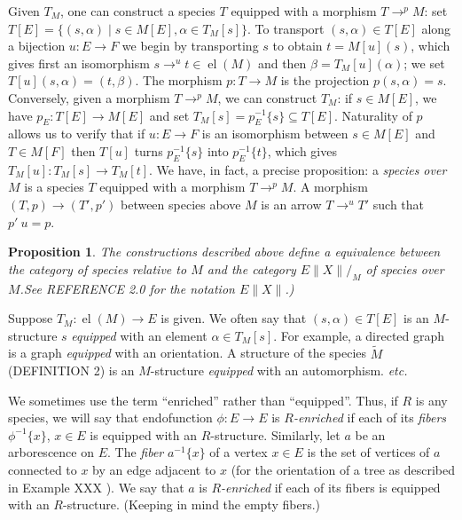 \documentclass{article}
\newtheorem{prop}[thm]{Proposition}
\theoremstyle{definition}
\theoremstyle{remark}
\DeclareMathOperator{\el}{el}
\newcommand{\term}[1]{\emph{#1}}
\begin{document}
Given $T_M$, one can construct a species $T$
equipped with a morphism $T \to^p M$: set $T [E] = \{(s, \alpha) \mid
s \in M [E], \alpha \in T_M[s]\}$. To transport $(s, \alpha) \in T[E]$
along a bijection $u : E \to F$ we begin by transporting $s$ to obtain
$t = M [u] (s)$, which gives first an isomorphism $s \to^u t \in
\el(M)$ and then $\beta = T_M [u] (\alpha)$; we set $T [u] (s, \alpha)
= (t, \beta)$. The morphism $p : T \to M$ is the projection $p (s,
\alpha) = s$. Conversely, given a morphism $T \to^p M$, we can
construct $T_M$: if $s \in M [E]$, we have $p_E: T [E] \to M [E]$ and
set $T_M [s] = p_E^{-1}\{s\} \subseteq T [E]$. Naturality of $p$
allows us to verify that if $u : E \to F$ is an isomorphism between $s
\in M [E]$ and $T \in M [F]$ then $T [u]$ turns $p_E^{-1} \{s\}$ into
$p_E^{-1} \{t\}$, which gives $T_M [u] : T_M [s] \to T_M [t]$. We
have, in fact, a precise proposition: a \term{species over $M$} is a
species $T$ equipped with a morphism $T \to^p M$. A morphism $(T, p)
\to (T', p')$ between species above $M$ is an arrow $T \to^u T'$ such
that $p'\ u = p$.

\begin{prop}
The constructions described above define a
equivalence between the category of species relative to $M$ and the category
$E \|X\|/_M$ of species over $M$.See REFERENCE 2.0 for the notation
$E\|X\|$.)
\end{prop}

Suppose $T_M: \el (M) \to E$ is given. We often say that $(s, \alpha)
\in T [E]$ is an $M$-structure $s$ \term{equipped} with an element
$\alpha \in T_M[s]$. For example, a directed graph is a graph
\term{equipped} with an orientation. A structure of the species
$\tilde M$ (DEFINITION 2) is an $M$-structure \term{equipped} with an
automorphism.  \emph{etc.}

We sometimes use the term ``enriched'' rather than ``equipped''. Thus,
if $R$ is any species, we will say that endofunction $\phi : E \to E$
is \term{$R$-enriched} if each of its \term{fibers} $\phi^{-1}\{x\}$,
$x \in E$ is equipped with an $R$-structure.  Similarly, let $a$ be an
arborescence  on $E$. The \term{fiber} $a^{-1}\{x\}$ of a
vertex $x \in E$ is the set of vertices of $a$ connected to $x$ by an
edge adjacent to $x$ (for the orientation of a tree as described in
Example XXX ). We say that $a$ is \term{$R$-enriched} if each of its
fibers is equipped with an $R$-structure. (Keeping in mind the empty
fibers.)
\end{document}
